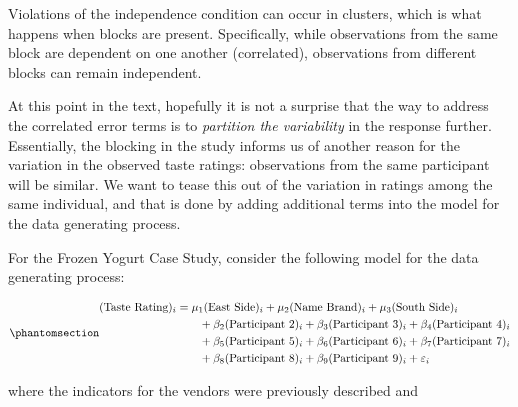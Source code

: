 \documentclass[
  letterpaper,
  DIV=11,
  numbers=noendperiod]{scrreprt}
\theoremstyle{definition}
\theoremstyle{definition}
\theoremstyle{plain}
\theoremstyle{remark}
\begin{document}
\begin{tcolorbox}[enhanced jigsaw, colbacktitle=quarto-callout-note-color!10!white, colback=white, left=2mm, title=\textcolor{quarto-callout-note-color}{\faInfo}\hspace{0.5em}{Note}, toptitle=1mm, leftrule=.75mm, breakable, bottomrule=.15mm, arc=.35mm, rightrule=.15mm, toprule=.15mm, coltitle=black, opacityback=0, colframe=quarto-callout-note-color-frame, opacitybacktitle=0.6, bottomtitle=1mm, titlerule=0mm]

Violations of the independence condition can occur in clusters, which is
what happens when blocks are present. Specifically, while observations
from the same block are dependent on one another (correlated),
observations from different blocks can remain independent.

\end{tcolorbox}

At this point in the text, hopefully it is not a surprise that the way
to address the correlated error terms is to \emph{partition the
variability} in the response further. Essentially, the blocking in the
study informs us of another reason for the variation in the observed
taste ratings: observations from the same participant will be similar.
We want to tease this out of the variation in ratings among the same
individual, and that is done by adding additional terms into the model
for the data generating process.

For the Frozen Yogurt Case Study, consider the following model for the
data generating process:

\begin{equation}\phantomsection\label{eq-blockmodel-model}{
\begin{aligned}
  (\text{Taste Rating})_i &= \mu_1 (\text{East Side})_i + \mu_2 (\text{Name Brand})_i + \mu_3 (\text{South Side})_i \\
    &\qquad + \beta_2 (\text{Participant 2})_i + \beta_3 (\text{Participant 3})_i + \beta_4 (\text{Participant 4})_i \\
    &\qquad + \beta_5 (\text{Participant 5})_i + \beta_6 (\text{Participant 6})_i + \beta_7 (\text{Participant 7})_i \\
    &\qquad + \beta_8 (\text{Participant 8})_i + \beta_9 (\text{Participant 9})_i + \varepsilon_i
\end{aligned}
}\end{equation}

where the indicators for the vendors were previously described and
\end{document}
